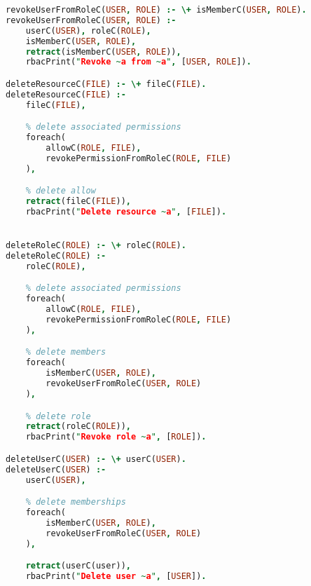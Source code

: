 \begin{lstlisting}[language=Prolog]
revokeUserFromRoleC(USER, ROLE) :- \+ isMemberC(USER, ROLE).
revokeUserFromRoleC(USER, ROLE) :-
    userC(USER), roleC(ROLE),
    isMemberC(USER, ROLE),
    retract(isMemberC(USER, ROLE)),
    rbacPrint("Revoke ~a from ~a", [USER, ROLE]).

deleteResourceC(FILE) :- \+ fileC(FILE).
deleteResourceC(FILE) :-
    fileC(FILE),

    % delete associated permissions
    foreach(
        allowC(ROLE, FILE),
        revokePermissionFromRoleC(ROLE, FILE)
    ),

    % delete allow
    retract(fileC(FILE)),
    rbacPrint("Delete resource ~a", [FILE]).


deleteRoleC(ROLE) :- \+ roleC(ROLE).
deleteRoleC(ROLE) :-
    roleC(ROLE),

    % delete associated permissions
    foreach(
        allowC(ROLE, FILE),
        revokePermissionFromRoleC(ROLE, FILE)
    ),

    % delete members
    foreach(
        isMemberC(USER, ROLE),
        revokeUserFromRoleC(USER, ROLE)
    ),

    % delete role
    retract(roleC(ROLE)),
    rbacPrint("Revoke role ~a", [ROLE]).

deleteUserC(USER) :- \+ userC(USER).
deleteUserC(USER) :-
    userC(USER),

    % delete memberships
    foreach(
        isMemberC(USER, ROLE),
        revokeUserFromRoleC(USER, ROLE)
    ),

    retract(userC(user)),
    rbacPrint("Delete user ~a", [USER]).    
\end{lstlisting}